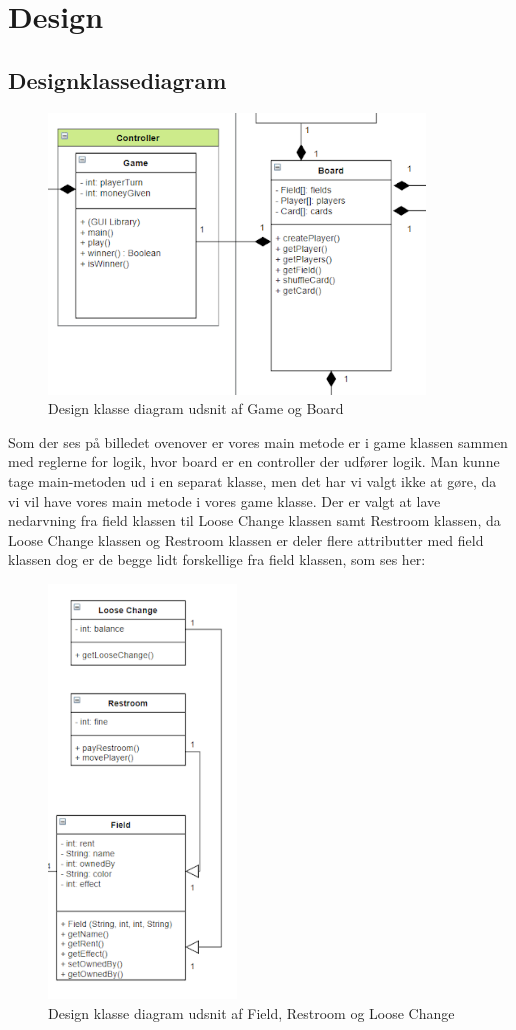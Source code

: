 \section{Design}
\subsection{Designklassediagram}
\begin{figure}[H]
    \includegraphics[width=10cm]{figures/Design klasse diagram Game Board}
    \caption{Design klasse diagram udsnit af Game og Board}
\end{figure}
Som der ses på billedet ovenover er vores main metode er i game klassen sammen med reglerne for logik, hvor board er en controller der udfører logik. Man kunne tage main-metoden ud i en separat klasse, men det har vi valgt ikke at gøre, da vi vil have vores main metode i vores game klasse.
Der er valgt at lave nedarvning fra field klassen til Loose Change klassen samt Restroom klassen, da Loose Change klassen og Restroom klassen er deler flere attributter med field klassen dog er de begge lidt forskellige fra field klassen, som ses her:
\begin{figure}[H]
    \includegraphics[width=5cm]{figures/Design klasse diagram fields}
    \caption{Design klasse diagram udsnit af Field, Restroom og Loose Change}
\end{figure}
